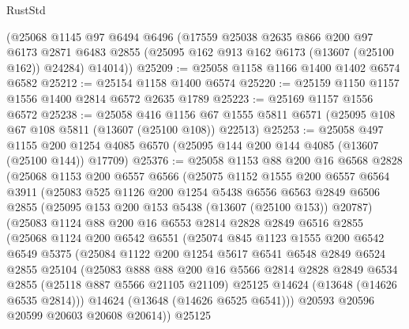 \begin{lexlean}{RustStd}
\begin{coremodule}
    (@25068
      @1145
      @97
      @6494
      @6496
      (@17559
        @25038
        @2635
        @866
        @200
        @97
        @6173
        @2871
        @6483
        @2855
        (@25095 @162 @913 @162 @6173 (@13607 (@25100 @162)) @24284)
        @14014))
@25209 := @25058 @1158 @1166 @1400 @1402 @6574 @6582
@25212 := @25154 @1158 @1400 @6574
@25220 := @25159 @1150 @1157 @1556 @1400 @2814 @6572 @2635 @1789
@25223 := @25169 @1157 @1556 @6572
@25238 := @25058
    @416
    @1156
    @67
    @1555
    @5811
    @6571
    (@25095 @108 @67 @108 @5811 (@13607 (@25100 @108)) @22513)
@25253 := @25058
    @497
    @1155
    @200
    @1254
    @4085
    @6570
    (@25095 @144 @200 @144 @4085 (@13607 (@25100 @144)) @17709)
@25376 := @25058
    @1153
    @88
    @200
    @16
    @6568
    @2828
    (@25068
      @1153
      @200
      @6557
      @6566
      (@25075
        @1152
        @1555
        @200
        @6557
        @6564
        @3911
        (@25083
          @525
          @1126
          @200
          @1254
          @5438
          @6556
          @6563
          @2849
          @6506
          @2855
          (@25095 @153 @200 @153 @5438 (@13607 (@25100 @153)) @20787)
          (@25083
            @1124
            @88
            @200
            @16
            @6553
            @2814
            @2828
            @2849
            @6516
            @2855
            (@25068
              @1124
              @200
              @6542
              @6551
              (@25074
                @845
                @1123
                @1555
                @200
                @6542
                @6549
                @5375
                (@25084
                  @1122
                  @200
                  @1254
                  @5617
                  @6541
                  @6548
                  @2849
                  @6524
                  @2855
                  @25104
                  (@25083
                    @888
                    @88
                    @200
                    @16
                    @5566
                    @2814
                    @2828
                    @2849
                    @6534
                    @2855
                    (@25118 @887 @5566 @21105 @21109)
                    @25125
                    @14624
                    (@13648 (@14626 @6535 @2814)))
                  @14624
                  (@13648 (@14626 @6525 @6541)))
                @20593
                @20596
                @20599
                @20603
                @20608
                @20614))
            @25125

\end{coremodule}
\end{lexlean}
